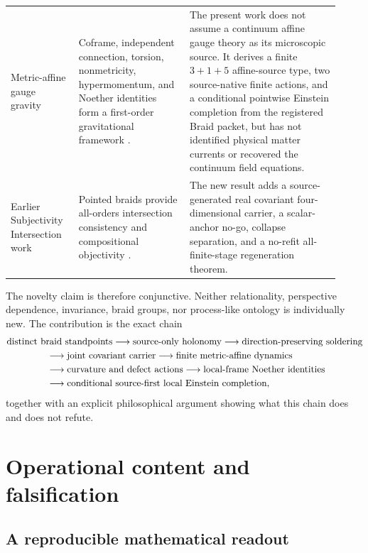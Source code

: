 \documentclass[11pt]{article}
\theoremstyle{definition}
\theoremstyle{remark}
\begin{document}
{\begin{longtable}{>{\raggedright\arraybackslash}p{0.19\linewidth}>{\raggedright\arraybackslash}p{0.31\linewidth}>{\raggedright\arraybackslash}p{0.42\linewidth}}
Metric-affine gauge gravity & Coframe, independent connection, torsion, nonmetricity, hypermomentum, and Noether identities form a first-order gravitational framework \cite{hehl1995}. & The present work does not assume a continuum affine gauge theory as its microscopic source. It derives a finite $3+1+5$ affine-source type, two source-native finite actions, and a conditional pointwise Einstein completion from the registered Braid packet, but has not identified physical matter currents or recovered the continuum field equations. \\
Earlier Subjectivity Intersection work & Pointed braids provide all-orders intersection consistency and compositional objectivity \cite{watanabe2026braid}. & The new result adds a source-generated real covariant four-dimensional carrier, a scalar-anchor no-go, collapse separation, and a no-refit all-finite-stage regeneration theorem. \\
\bottomrule
\end{longtable}
}

The novelty claim is therefore conjunctive. Neither relationality, perspective dependence, invariance, braid groups, nor process-like ontology is individually new. The contribution is the exact chain
\begin{equation}\label{eq:novelchain}
\begin{aligned}
&\text{distinct braid standpoints}
\longrightarrow\text{source-only holonomy}
\longrightarrow\text{direction-preserving soldering}\\
 &\hspace{15mm}\longrightarrow\text{joint covariant carrier}
 \longrightarrow\text{finite metric-affine dynamics}\\
 &\hspace{15mm}\longrightarrow\text{curvature and defect actions}
 \longrightarrow\text{local-frame Noether identities}\\
 &\hspace{15mm}\longrightarrow\text{conditional source-first local Einstein completion},
\end{aligned}
\end{equation}
together with an explicit philosophical argument showing what this chain does and does not refute.

\section{Operational content and falsification}

\subsection{A reproducible mathematical readout}
\end{document}
